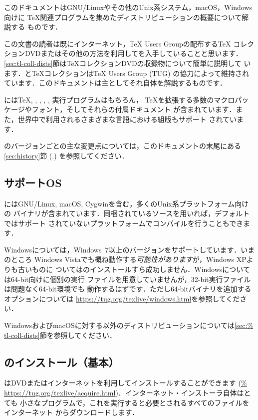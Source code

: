 \documentclass[uplatex,dvipdfmx,tombow]{jsarticle}
\begin{document}
このドキュメントはGNU/Linuxやその他のUnix系システム，macOS，Windows向けに
\TeX 関連プログラムを集めたディストリビューション\TL の概要について解説する
ものです．

この文書の読者は既にインターネット，{\TeX} Users Groupの配布する\TeX
コレクションDVDまたはその他の方法を利用して\TL を入手していることと思います．
\ref{sec:tl-coll-dists}節は\TeX コレクションDVDの収録物について簡単に説明して
います．\TL と\TeX コレクションは{\TeX} Users Group (TUG) の協力によって維持され
ています．このドキュメントは主として\TL それ自体を解説するものです．

\TL には\TeX, \LaTeXe, \ConTeXt, \MF, \MP, \BibTeX 実行プログラムはもちろん，
\TeX を拡張する多数のマクロパッケージやフォント，そしてそれらの付属ドキュメント
が含まれています．また，世界中で利用されるさまざまな言語における組版もサポート
されています．

\TL のバージョンごとの主な変更点については，このドキュメントの末尾にある
\ref{sec:history}節 (\p.\pageref{sec:history}) を参照してください．

\subsection{サポートOS}
\label{sec:os-support}

\TL にはGNU/Linux, macOS, Cygwinを含む，多くのUnix系プラットフォーム向けの
バイナリが含まれています．同梱されているソースを用いれば，デフォルトではサポート
されていないプラットフォームでコンパイルを行うこともできます．

Windowsについては，Windows~7以上のバージョンをサポートしています．いまのところ
Windows Vistaでも概ね動作する\emph{可能性があります}が，Windows XPよりも古いものに
ついては\TL のインストールすら成功しません．Windowsについては64-bit向けに個別の実行
ファイルを用意していませんが，32-bit実行ファイルは問題なく64-bit環境でも
動作するはずです．ただし64-bitバイナリを追加するオプションについては
\url{https://tug.org/texlive/windows.html}を参照してください．

WindowsおよびmacOSに対する\TL 以外のディストリビューションについては\ref{sec:%
tl-coll-dists}節を参照してください．

\subsection{\TL のインストール（基本）}
\label{sec:basic}

\TL はDVDまたはインターネットを利用してインストールすることができます (\url{%
https://tug.org/texlive/acquire.html})．インターネット・インストーラ自体はとても
小さなプログラムで，これを実行すると必要とされるすべてのファイルをインターネット
からダウンロードします．
\end{document}
